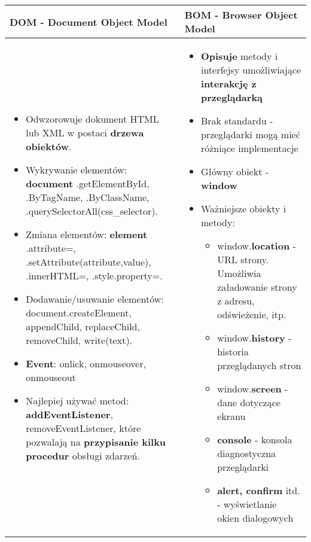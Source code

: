 \documentclass[../main.tex]{subfiles}
\begin{document}
    \begin{table}[H]
        \begin{center}
            \begin{tabular}{| p{8cm} | p{8cm}| }
                \hline
                \textbf{DOM} - Document Object Model &  \textbf{BOM} - Browser Object Model\\
                \hline
                \hline
                \begin{itemize}
                    \item Odwzorowuje dokument HTML lub XML w postaci \textbf{drzewa obiektów}.
                    \item Wykrywanie elementów: \textbf{document} .getElementById, .ByTagName, .ByClassName, .querySelectorAll(css\_selector).
                    \item Zmiana elementów: \textbf{element} .attribute=, .setAttribute(attribute,value), .innerHTML=, .style.property=.
                    \item Dodawanie/usuwanie elementów: document.createElement, appendChild, replaceChild, removeChild, write(text).
                    \item \textbf{Event}: onlick, onmouseover, onmouseout
                    \item Najlepiej używać metod: \textbf{addEventListener}, removeEventListener, które pozwalają na \textbf{przypisanie kilku procedur} obsługi zdarzeń.
                \end{itemize}
                &
                \begin{itemize}
                    \item \textbf{Opisuje} metody i interfejsy umożliwiające \textbf{interakcję z przeglądarką}
                    \item Brak standardu - przeglądarki mogą mieć różniące implementacje
                    \item Główny obiekt - \textbf{window}
                    \item Ważniejsze obiekty i metody:
                    \begin{itemize}
                        \item window.\textbf{location} - URL strony. Umożliwia załadowanie strony z adresu, odświeżenie, itp.
                        \item window.\textbf{history} - historia przeglądanych stron
                        \item window.\textbf{screen} - dane dotyczące ekranu
                        \item \textbf{console} - konsola diagnostyczna przeglądarki
                        \item \textbf{alert, confirm} itd. - wyświetlanie okien dialogowych
                    \end{itemize}
                \end{itemize}\\
                \hline
            \end{tabular}
        \end{center}
    \end{table}
\end{document}

